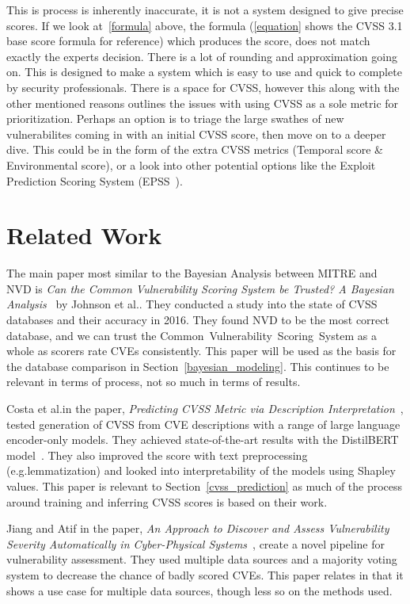 \documentclass[12pt]{article}
\begin{document}
This is process is inherently inaccurate, it is not a system designed to give precise scores. If we
look at~\ref{formula} above, the formula (\ref{equation} shows the CVSS 3.1 base score formula for
reference) which produces the score, does not match exactly the experts decision. There is a lot of
rounding and approximation going on. This is designed to make a system which is easy to use and
quick to complete by security professionals. There is a space for CVSS, however this along with the
other mentioned reasons outlines the issues with using CVSS as a sole metric for prioritization. Perhaps an option
is to triage the large swathes of new vulnerabilites coming in with an initial CVSS score, then move
on to a deeper dive. This could be in the form of the extra CVSS metrics (Temporal score \&
Environmental score), or a look into other potential options like the Exploit Prediction Scoring
System (EPSS~\cite{EPSS}).

\section{Related Work}

The main paper most similar to the Bayesian Analysis between MITRE and NVD is
\textit{Can the Common Vulnerability Scoring System be Trusted? A Bayesian
	Analysis}~\cite{bayes} by Johnson et al.\@. They conducted a study into the state of CVSS databases and their accuracy in 2016.
They found NVD to be the most correct database, and we can trust the Common~Vulnerability~Scoring~System as a
whole as scorers rate CVEs consistently. This paper will be used as the basis for the database
comparison in Section~\ref{bayesian_modeling}. This continues to be relevant in terms of process,
not so much in terms of results.

Costa et al.\@ in the paper, \textit{Predicting CVSS Metric via Description
	Interpretation}~\cite{costa}, tested generation of CVSS from CVE descriptions with a range of large
language encoder-only models. They achieved state-of-the-art results with the DistilBERT
model~\cite{distilbert}. They also improved the score with text preprocessing (e.g.\@ lemmatization)
and looked into interpretability of the models using Shapley values. This paper is relevant to
Section~\ref{cvss_prediction} as much of the process around training and inferring CVSS scores is
based on their work.

Jiang and Atif in the paper, \textit{An Approach to Discover and Assess
	Vulnerability Severity Automatically in Cyber-Physical Systems}~\cite{jiang}, create a novel
pipeline for vulnerability assessment. They used multiple data sources and a majority voting system
to decrease the chance of badly scored CVEs. This paper relates in that it shows a use case for
multiple data sources, though less so on the methods used.
\end{document}
